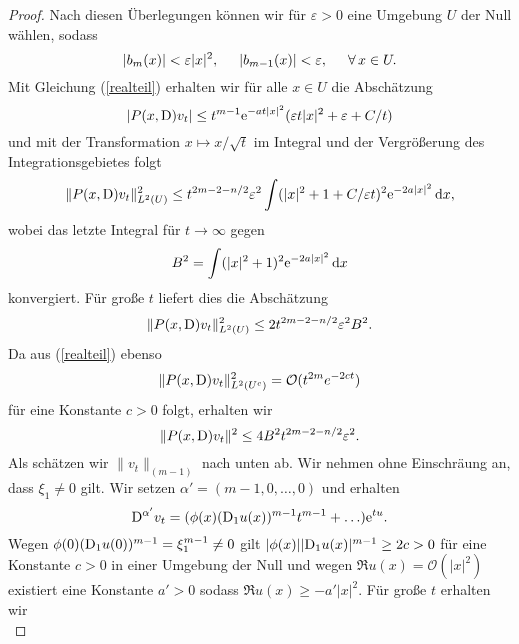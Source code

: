 \begin{proof}
Nach diesen Überlegungen können wir für $\varepsilon >0$ eine Umgebung $U$ der Null wählen, sodass
\begin{equation}
|b_m(x)| < \varepsilon |x|^2, \hspace{0.5cm} |b_{m-1}(x)| < \varepsilon, \hspace{0.5cm} \forall \, x \in U.
\end{equation}
Mit Gleichung (\ref{realteil}) erhalten wir für alle $x\in U$ die Abschätzung
\begin{equation}
|P(x,\mathrm D)v_t| \le t^{m-1} \mathrm e^{-at|x|^2}(\varepsilon t |x|^2 + \varepsilon + C/t)
\end{equation}
und mit der Transformation $x \mapsto x/\sqrt{t}$ im Integral und der Vergrößerung des Integrationsgebietes folgt
\begin{equation}
\lVert P(x,\mathrm D) v_t \rVert_{L^2(U)} ^2 \le t^{2m-2-n/2} \varepsilon^2 \int (|x|^2 + 1 +C/\varepsilon t)^2 \mathrm e^{-2a|x|^2} \,\mathrm d x,
\end{equation}
wobei das letzte Integral für $t \rightarrow \infty$ gegen
\begin{equation}
B^2 = \int (|x|^2 + 1)^2 \mathrm e^{-2a|x|^2} \,\mathrm d x
\end{equation}
konvergiert. Für große $t$ liefert dies die Abschätzung
\begin{equation}
\lVert P(x,\mathrm D) v_t \rVert_{L^2(U)} ^2 \le 2 t^{2m-2-n/2} \varepsilon^2  B^2.
\end{equation}
Da aus (\ref{realteil}) ebenso
\begin{equation}
\lVert P(x,\mathrm D) v_t \rVert_{L^2(U^c)} ^2 = \mathcal{O}(t^{2m}e^{-2ct})
\end{equation}
für eine Konstante $c>0$ folgt, erhalten wir
\begin{equation}
	\label{4.18}
\lVert P(x,\mathrm D) v_t \rVert^2 \le 4 B^2 t^{2m-2-n/2} \varepsilon^2.
\end{equation}
Als schätzen wir $\lVert v_t \rVert_{(m-1)}$ nach unten ab. Wir nehmen ohne Einschräung an, dass $\xi_1\neq 0$ gilt. Wir setzen $\alpha' = (m-1,0,\ldots,0)$ und erhalten
\begin{equation}
\mathrm D^{\alpha'} v_t = (\phi(x) (\mathrm D_1 u(x))^{m-1}t^{m-1}+ \ldots)\mathrm e^{tu}.
\end{equation}
Wegen $\phi(0) (\mathrm D_1u(0))^{m-1} = \xi_1^{m-1} \neq 0$ gilt $|\phi(x)| |\mathrm D_1u(x)|^{m-1} \ge 2c > 0$ für eine Konstante $c > 0$ in einer Umgebung der Null und wegen $\Re u(x) = \mathcal{O} (|x|^2)$ existiert eine Konstante $a' > 0$ sodass $\Re u(x) \ge -a' |x|^2$. Für große $t$ erhalten wir
\begin{equation}

\end{equation}
\end{proof}
